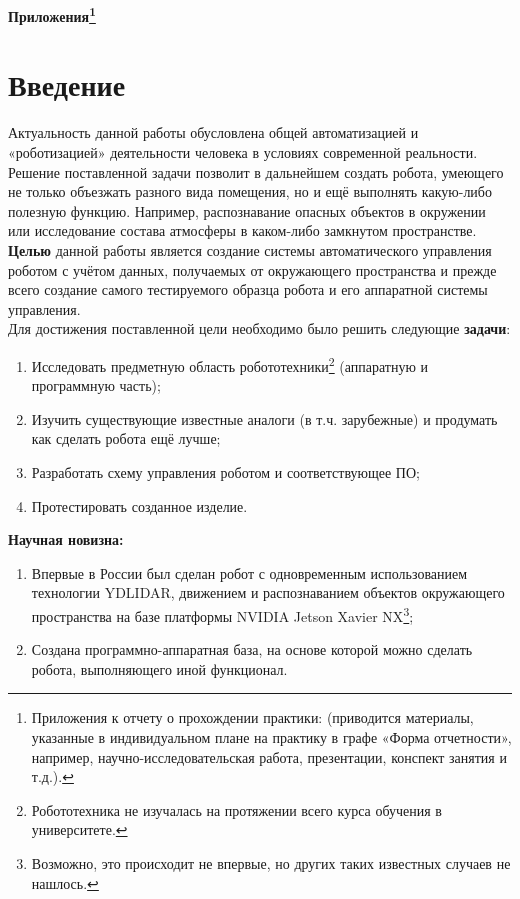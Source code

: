 \documentclass[12pt,a4paper]{scrartcl}
\begin{document}
		\newpage
	
	\begin{center}
		\textbf{Приложения\footnote{Приложения к отчету о прохождении практики: (приводится материалы, указанные в индивидуальном плане на практику в графе «Форма отчетности», например, научно-исследовательская работа, презентации, конспект занятия и т.д.).}}
	\end{center}
	
		\tableofcontents
		
		\newpage
		
		\section*{Введение}
			Актуальность данной работы обусловлена общей автоматизацией и «роботизацией» деятельности человека в условиях современной реальности\cite{bib:AutomatizationRobotization}. Решение поставленной задачи позволит в дальнейшем создать робота, умеющего не только объезжать разного вида помещения, но и ещё выполнять какую-либо полезную функцию. Например, распознавание опасных объектов в окружении или исследование состава атмосферы в каком-либо замкнутом пространстве. \\
			
			\textbf{Целью} данной работы является создание системы автоматического управления роботом с учётом данных, получаемых от окружающего пространства и прежде всего создание самого тестируемого образца робота и его аппаратной системы управления. \\
			
			Для достижения поставленной цели необходимо было решить следующие \textbf{задачи}:
			\begin{enumerate}
				\item Исследовать предметную область робототехники\footnote{Робототехника не изучалась на протяжении всего курса обучения в университете.} (аппаратную и программную часть);
				\item Изучить существующие известные аналоги (в т.ч. зарубежные) и продумать как сделать робота ещё лучше;
				\item Разработать схему управления роботом и соответствующее ПО;
				\item Протестировать созданное изделие.
			\end{enumerate}
			
			\textbf{Научная новизна:}
			\begin{enumerate}
				\item Впервые в России был сделан робот с одновременным использованием технологии YDLIDAR, движением и распознаванием объектов окружающего пространства на базе платформы NVIDIA Jetson Xavier NX\footnote{Возможно, это происходит не впервые, но других таких известных случаев не нашлось.};
				\item Создана программно-аппаратная база, на основе которой можно сделать робота, выполняющего иной функционал.
			\end{enumerate}
			
\end{document}
